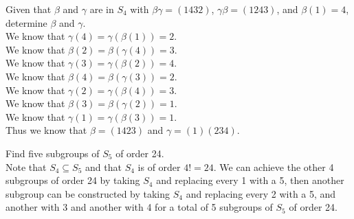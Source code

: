 \documentclass[12pt]{article}
\makeatletter
\theoremstyle{homework}
\newenvironment{exercise}[1]
{\def\@currentlabel{#1}\exercisecore}
{\endexercisecore}
\makeatother
\begin{document}
\begin{exercise}{5.76}
Given that $\beta$ and $\gamma$ are in $S_4$ with $\beta\gamma = (1432)$, $\gamma\beta = (1243)$, and $\beta(1)= 4$, determine $\beta$ and $\gamma$.\\
We know that $\gamma(4)=\gamma(\beta(1))=2$.\\
We know that $\beta(2)=\beta(\gamma(4))=3$.\\
We know that $\gamma(3)=\gamma(\beta(2))=4$.\\
We know that $\beta(4)=\beta(\gamma(3))=2$.\\
We know that $\gamma(2)=\gamma(\beta(4))=3$.\\
We know that $\beta(3)=\beta(\gamma(2))=1$.\\
We know that $\gamma(1)=\gamma(\beta(3))=1$.\\
Thus we know that $\beta=(1423)$ and $\gamma=(1)(234)$.
\end{exercise}

\begin{exercise}{5.78}
Find five subgroups of $S_5$ of order 24.\\
Note that $S_4\subseteq S_5$ and that $S_4$ is of order $4!=24$.  We can achieve the other 4 subgroups of order 24 by taking $S_4$ and replacing every 1 with a 5, then another subgroup can be constructed by taking $S_4$ and replacing every 2 with a 5, and another with 3 and another with 4 for a  total of 5 subgroups of $S_5$ of order 24.
\end{exercise}
\end{document}
